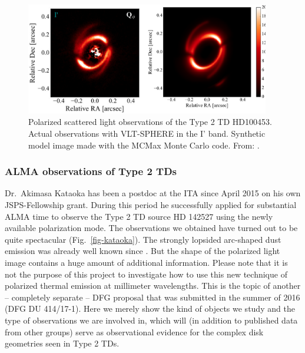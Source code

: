 \documentclass[10pt,fleqn,twoside]{article}
\begin{document}
\begin{figure}
\centerline{\includegraphics[width=0.95\textwidth]{D2Fig/Benisty-eps-converted-to.pdf}}
\caption{\label{fig-benisty} Polarized scattered light observations of the
  Type 2 TD HD100453.  Actual observations with
  VLT-SPHERE in the I' band.  Synthetic model image
  made with the MCMax Monte Carlo code. From: \citet{2016arXiv161010089B}.}
\end{figure}

\subsubsection{ALMA observations of Type 2 TDs}
Dr.~Akimasa Kataoka has been a postdoc at the ITA since April 2015 on his
own JSPS-Fellowship grant. During this period he successfully applied for
substantial ALMA time to observe the Type 2 TD source HD 142527 using the
newly available polarization mode. The observations we obtained have turned
out to be quite spectacular (Fig.~\ref{fig-kataoka}). The strongly lopsided
arc-shaped dust emission was already well known since
\citep{2013Natur.493..191C}. But the shape of the polarized light image
contains a huge amount of additional information. Please note that it is not
the purpose of this project to investigate how to use this new technique of
polarized thermal emission at millimeter wavelengths. This is the topic of
another -- completely separate -- DFG proposal that was submitted in the
summer of 2016 (DFG DU 414/17-1). Here we merely show the kind of objects we
study and the type of observations we are involved in, which will (in
addition to published data from other groups) serve as observational
evidence for the complex disk geometries seen in Type 2 TDs.
\end{document}
